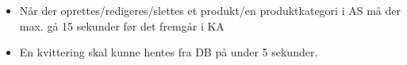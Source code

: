 
\begin{itemize}

\item Når der oprettes/redigeres/slettes et produkt/en produktkategori i \gls{AS} må der max. gå 15 sekunder før det fremgår i \gls{KA}
\item En kvittering skal kunne hentes fra \gls{DB} på under 5 sekunder.

\end{itemize}